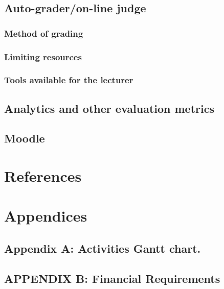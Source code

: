 \documentclass[12pt]{article}
\begin{document}
	\subsection{Auto-grader/on-line judge}
		\subsubsection{Method of grading}
		\subsubsection{Limiting resources}
		\subsubsection{Tools available for the lecturer}
	\subsection{Analytics and other evaluation metrics}
	\subsection{Moodle}

\section{References}

\section{Appendices}
	\subsection{Appendix A: Activities Gantt chart.}
	\subsection{APPENDIX B: Financial Requirements}
\end{document}
